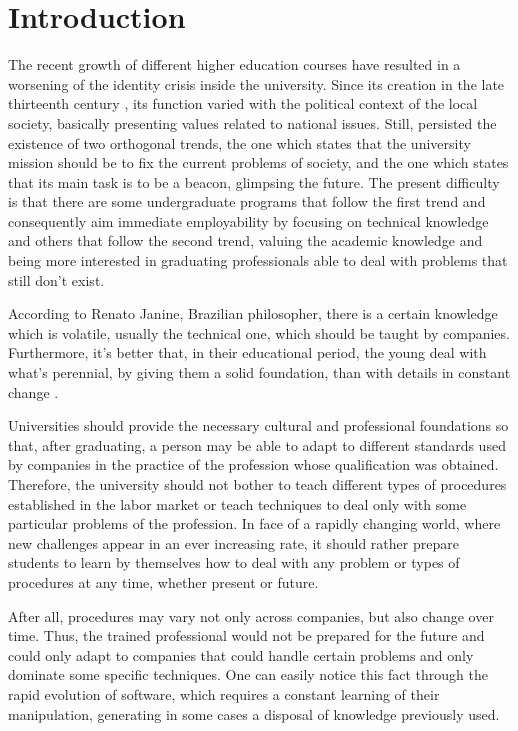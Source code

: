 \documentclass[conference]{IEEEtran}
\begin{document}
\section{Introduction}
	The recent growth of different higher education courses have resulted in a worsening of the identity crisis inside the university. Since its creation in the late thirteenth century \cite{oliveira:origem_universidades}, its function varied with the political context of the local society, basically presenting values related to national issues. Still, persisted the existence of two orthogonal trends, the one which states that the university mission should be to fix the current problems of society, and the one which states that its main task is to be a beacon, glimpsing the future. The present difficulty is that there are some undergraduate programs that follow the first trend and consequently aim immediate employability by focusing on technical knowledge and others that follow the second trend, valuing the academic knowledge and being more interested in graduating professionals able to deal with problems that still don't exist. 

	
	According to Renato Janine, Brazilian philosopher, there is a certain knowledge which is volatile, usually the technical one, which should be taught by companies. Furthermore, it's better that, in their educational period, the young deal with what's perennial, by giving them a solid foundation, than with details in constant change \cite{ribeiro:universidade_vida_atual}.

	Universities should provide the necessary cultural and professional foundations so that, after graduating, a person may be able to adapt to different standards used by companies in the practice of the profession whose qualification was obtained. Therefore, the university should not bother to teach different types of procedures established in the labor market or teach techniques to deal only with some particular problems of the profession. In face of a rapidly changing world, where new challenges appear in an ever increasing rate, it should rather prepare students to learn by themselves how to deal with any problem or types of procedures at any time, whether present or future.

	After all, procedures may vary not only across companies, but also change over time. Thus, the trained professional would not be prepared for the future and could only adapt to companies that could handle certain problems and only dominate some specific techniques. One can easily notice this fact through the rapid evolution of software, which requires a constant learning of their manipulation, generating in some cases a disposal of knowledge previously used.
\end{document}

